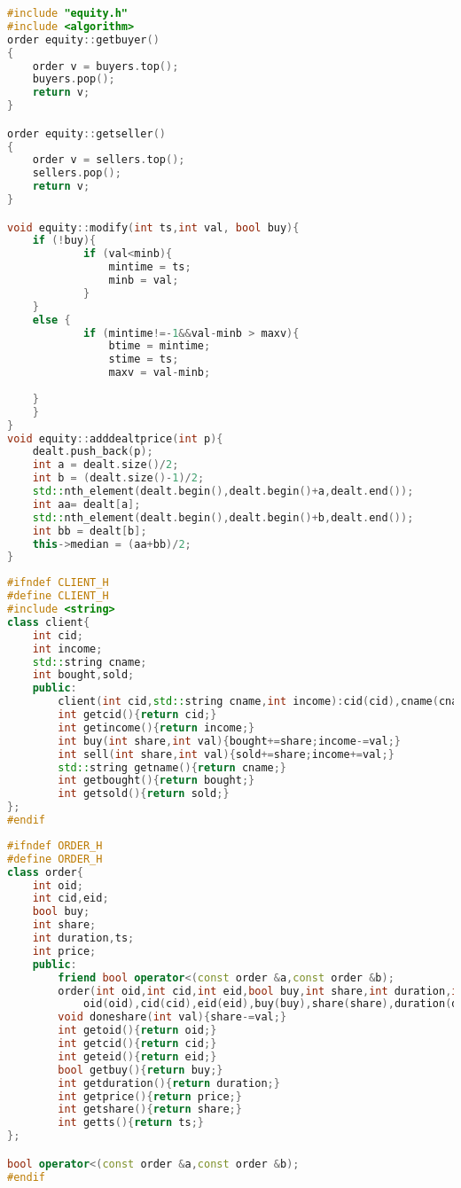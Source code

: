 \documentclass{article}
\begin{document}
\begin{lstlisting}[title=equity.cpp,language=C++]
#include "equity.h"
#include <algorithm>
order equity::getbuyer()
{
    order v = buyers.top();
    buyers.pop();
    return v;
}

order equity::getseller()
{
    order v = sellers.top();
    sellers.pop();
    return v;
}

void equity::modify(int ts,int val, bool buy){
    if (!buy){
            if (val<minb){
                mintime = ts;
                minb = val;
            }
    }
    else {
            if (mintime!=-1&&val-minb > maxv){
                btime = mintime;
                stime = ts;
                maxv = val-minb;
            
    }
    }
}
void equity::adddealtprice(int p){
    dealt.push_back(p);
    int a = dealt.size()/2;
    int b = (dealt.size()-1)/2;
    std::nth_element(dealt.begin(),dealt.begin()+a,dealt.end());
    int aa= dealt[a];
    std::nth_element(dealt.begin(),dealt.begin()+b,dealt.end());
    int bb = dealt[b];
    this->median = (aa+bb)/2;
}
\end{lstlisting}

\begin{lstlisting}[title=client.h,language=C++]
#ifndef CLIENT_H
#define CLIENT_H
#include <string>
class client{
    int cid;
    int income;
    std::string cname;
    int bought,sold;
    public:
        client(int cid,std::string cname,int income):cid(cid),cname(cname),income(income),bought(0),sold(0){}
        int getcid(){return cid;}
        int getincome(){return income;}
        int buy(int share,int val){bought+=share;income-=val;}
        int sell(int share,int val){sold+=share;income+=val;}
        std::string getname(){return cname;}
        int getbought(){return bought;}
        int getsold(){return sold;}
};
#endif
    \end{lstlisting}

    \begin{lstlisting}[title=order.h,language=C++]
#ifndef ORDER_H
#define ORDER_H
class order{
    int oid;
    int cid,eid;
    bool buy;
    int share;
    int duration,ts;
    int price;
    public:
        friend bool operator<(const order &a,const order &b);
        order(int oid,int cid,int eid,bool buy,int share,int duration,int ts,int price):
            oid(oid),cid(cid),eid(eid),buy(buy),share(share),duration(duration),ts(ts),price(price){}
        void doneshare(int val){share-=val;}
        int getoid(){return oid;}
        int getcid(){return cid;}
        int geteid(){return eid;}
        bool getbuy(){return buy;}
        int getduration(){return duration;}
        int getprice(){return price;}
        int getshare(){return share;}
        int getts(){return ts;}
};

bool operator<(const order &a,const order &b);
#endif
            \end{lstlisting}
\end{document}
